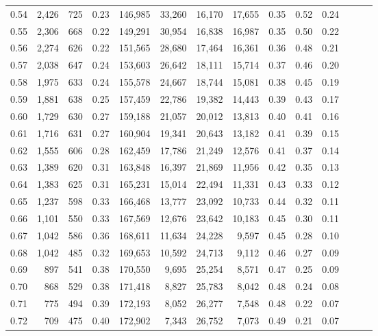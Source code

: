 \begin{tabular}{rrrrrrrrrrrrrr}
0.54 &  2,426 &  725 &  0.23 &  146,985 &   33,260 &  16,170 &  17,655 &  0.35 &  0.52 &      0.24 \\
0.55 &  2,306 &  668 &  0.22 &  149,291 &   30,954 &  16,838 &  16,987 &  0.35 &  0.50 &      0.22 \\
0.56 &  2,274 &  626 &  0.22 &  151,565 &   28,680 &  17,464 &  16,361 &  0.36 &  0.48 &      0.21 \\
0.57 &  2,038 &  647 &  0.24 &  153,603 &   26,642 &  18,111 &  15,714 &  0.37 &  0.46 &      0.20 \\
0.58 &  1,975 &  633 &  0.24 &  155,578 &   24,667 &  18,744 &  15,081 &  0.38 &  0.45 &      0.19 \\
0.59 &  1,881 &  638 &  0.25 &  157,459 &   22,786 &  19,382 &  14,443 &  0.39 &  0.43 &      0.17 \\
0.60 &  1,729 &  630 &  0.27 &  159,188 &   21,057 &  20,012 &  13,813 &  0.40 &  0.41 &      0.16 \\
0.61 &  1,716 &  631 &  0.27 &  160,904 &   19,341 &  20,643 &  13,182 &  0.41 &  0.39 &      0.15 \\
0.62 &  1,555 &  606 &  0.28 &  162,459 &   17,786 &  21,249 &  12,576 &  0.41 &  0.37 &      0.14 \\
0.63 &  1,389 &  620 &  0.31 &  163,848 &   16,397 &  21,869 &  11,956 &  0.42 &  0.35 &      0.13 \\
0.64 &  1,383 &  625 &  0.31 &  165,231 &   15,014 &  22,494 &  11,331 &  0.43 &  0.33 &      0.12 \\
0.65 &  1,237 &  598 &  0.33 &  166,468 &   13,777 &  23,092 &  10,733 &  0.44 &  0.32 &      0.11 \\
0.66 &  1,101 &  550 &  0.33 &  167,569 &   12,676 &  23,642 &  10,183 &  0.45 &  0.30 &      0.11 \\
0.67 &  1,042 &  586 &  0.36 &  168,611 &   11,634 &  24,228 &   9,597 &  0.45 &  0.28 &      0.10 \\
0.68 &  1,042 &  485 &  0.32 &  169,653 &   10,592 &  24,713 &   9,112 &  0.46 &  0.27 &      0.09 \\
0.69 &    897 &  541 &  0.38 &  170,550 &    9,695 &  25,254 &   8,571 &  0.47 &  0.25 &      0.09 \\
0.70 &    868 &  529 &  0.38 &  171,418 &    8,827 &  25,783 &   8,042 &  0.48 &  0.24 &      0.08 \\
0.71 &    775 &  494 &  0.39 &  172,193 &    8,052 &  26,277 &   7,548 &  0.48 &  0.22 &      0.07 \\
0.72 &    709 &  475 &  0.40 &  172,902 &    7,343 &  26,752 &   7,073 &  0.49 &  0.21 &      0.07 \\

\end{tabular}
